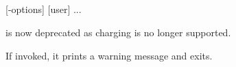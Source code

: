 \subsection{\BtchargeName}

\begin{expara}

\BtchargeName{} [-options] [user] ...

\end{expara}

\PrBtcharge{} is now deprecated as charging is no longer supported.

If invoked, it prints a warning message and exits.

